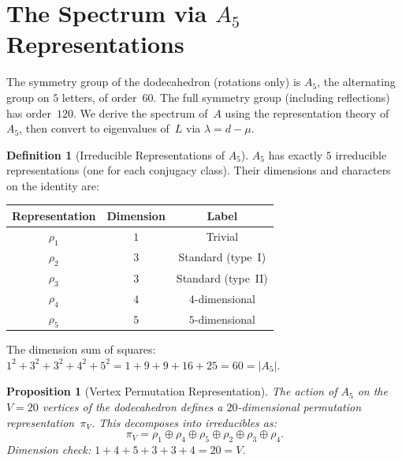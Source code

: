 \documentclass[11pt,a4paper]{article}
\theoremstyle{plain}
\newtheorem{proposition}[theorem]{Proposition}
\theoremstyle{definition}
\newtheorem{definition}[theorem]{Definition}
\begin{document}
\section{The Spectrum via $A_5$ Representations}\label{sec:spectrum}

The symmetry group of the dodecahedron (rotations only) is $A_5$,
the alternating group on $5$ letters, of order~$60$.  The full symmetry
group (including reflections) has order~$120$.  We derive the spectrum
of~$A$ using the representation theory of~$A_5$, then convert to
eigenvalues of~$L$ via $\lambda = d - \mu$.

\begin{definition}[Irreducible Representations of $A_5$]\label{def:irreps}
$A_5$ has exactly $5$ irreducible representations (one for each
conjugacy class).  Their dimensions and characters on the identity are:
\begin{center}
\begin{tabular}{@{}ccc@{}}
\toprule
Representation & Dimension & Label \\
\midrule
$\rho_1$ & $1$ & Trivial \\
$\rho_2$ & $3$ & Standard (type~I) \\
$\rho_3$ & $3$ & Standard (type~II) \\
$\rho_4$ & $4$ & $4$-dimensional \\
$\rho_5$ & $5$ & $5$-dimensional \\
\bottomrule
\end{tabular}
\end{center}
The dimension sum of squares: $1^2 + 3^2 + 3^2 + 4^2 + 5^2 =
1 + 9 + 9 + 16 + 25 = 60 = |A_5|$.
\end{definition}

\begin{proposition}[Vertex Permutation Representation]\label{prop:vertex-rep}
The action of $A_5$ on the $V = 20$ vertices of the dodecahedron
defines a $20$-dimensional permutation representation~$\pi_V$.  This
decomposes into irreducibles as:
\[
  \pi_V = \rho_1 \oplus \rho_4 \oplus \rho_5
          \oplus \rho_2 \oplus \rho_3 \oplus \rho_4.
\]
Dimension check: $1 + 4 + 5 + 3 + 3 + 4 = 20 = V$. \checkmark
\end{proposition}
\end{document}
